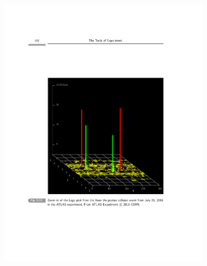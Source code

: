 {\begin{itemize}
{\begin{figure}[h!]
\centering
\includegraphics[width=0.8\textwidth]{./EventDisplayZoom.pdf}
\end{figure}

}


\end{itemize}




}

